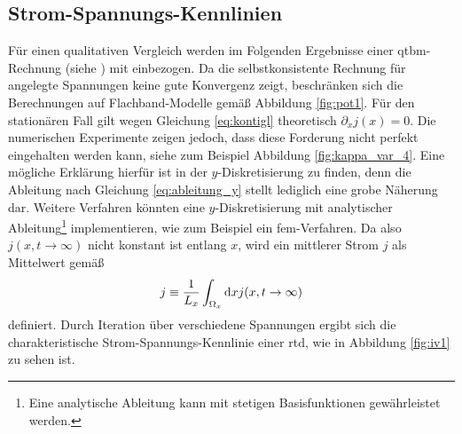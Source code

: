 \subsection{Strom-Spannungs-Kennlinien} 
Für einen qualitativen Vergleich werden im Folgenden Ergebnisse einer \ac{qtbm}-Rechnung (siehe \cite{qtbm}) mit einbezogen. Da die selbstkonsistente Rechnung für angelegte Spannungen keine gute Konvergenz zeigt, beschränken sich die Berechnungen auf Flachband-Modelle gemäß Abbildung \ref{fig:pot1}. Für den stationären Fall gilt wegen Gleichung \eqref{eq:kontigl} theoretisch $\partial_x j(x)=0$. Die numerischen Experimente zeigen jedoch, dass diese Forderung nicht perfekt eingehalten werden kann, siehe zum Beispiel Abbildung \ref{fig:kappa_var_4}. Eine mögliche Erklärung hierfür ist in der $y$-Diskretisierung zu finden, denn die Ableitung nach Gleichung \eqref{eq:ableitung_y} stellt lediglich eine grobe Näherung dar. Weitere Verfahren könnten eine $y$-Diskretisierung mit analytischer Ableitung\footnote{Eine analytische Ableitung kann mit stetigen Basisfunktionen gewährleistet werden.} implementieren, wie zum Beispiel ein \ac{fem}-Verfahren.
Da also ${j(x,t\rightarrow \infty)}$ nicht konstant ist entlang $x$, wird ein mittlerer Strom $j$ als Mittelwert gemäß
\begin{equation*}
  j \equiv \frac{1}{L_x} \int_{\Omega_x} \mathop{}\!\mathrm{d} x j(x,t\rightarrow\infty)
\end{equation*}
definiert. Durch Iteration über verschiedene Spannungen ergibt sich die charakteristische Strom-Spannungs-Kennlinie einer \ac{rtd}, wie in Abbildung \ref{fig:iv1} zu sehen ist.
